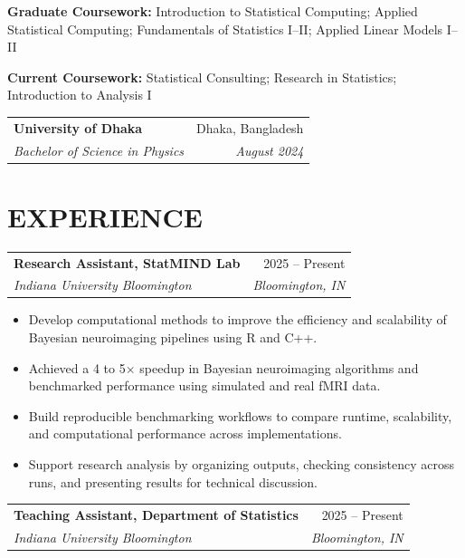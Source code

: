 \documentclass[10pt,letterpaper]{article}
\makeatletter
\newcommand{\resumeEntry}[4]{%
  \begin{tabularx}{\textwidth}{@{}Xr@{}}
    \textbf{#1} & #2 \\
    \textit{#3} & \textit{#4}
  \end{tabularx}%
}
\newenvironment{resumeItems}{%
  \begin{itemize}[
    label=\textbullet,
    leftmargin=14pt,
    labelsep=5pt,
    itemsep=0.5pt,
    topsep=1.0pt,
    parsep=0pt,
    partopsep=0pt
  ]
}{%
  \end{itemize}
}
\makeatother
\begin{document}
\vspace{0.5pt}

\textbf{Graduate Coursework:}
Introduction to Statistical Computing; Applied Statistical Computing;
Fundamentals of Statistics I--II; Applied Linear Models I--II

\vspace{0.3pt}

\textbf{Current Coursework:}
Statistical Consulting; Research in Statistics;
Introduction to Analysis I

\vspace{2.2pt}

\resumeEntry
  {University of Dhaka}
  {Dhaka, Bangladesh}
  {Bachelor of Science in Physics}
  {August 2024}

\section*{EXPERIENCE}

\resumeEntry
  {Research Assistant, StatMIND Lab}
  {2025 -- Present}
  {Indiana University Bloomington}
  {Bloomington, IN}

\begin{resumeItems}
  \item Develop computational methods to improve the efficiency and scalability of Bayesian neuroimaging pipelines using R and C++.

  \item Achieved a 4 to 5$\times$ speedup in Bayesian neuroimaging algorithms and benchmarked performance using simulated and real fMRI data.

  \item Build reproducible benchmarking workflows to compare runtime, scalability, and computational performance across implementations.

  \item Support research analysis by organizing outputs, checking consistency across runs, and presenting results for technical discussion.
\end{resumeItems}

\vspace{1.3pt}

\resumeEntry
  {Teaching Assistant, Department of Statistics}
  {2025 -- Present}
  {Indiana University Bloomington}
  {Bloomington, IN}
\end{document}
